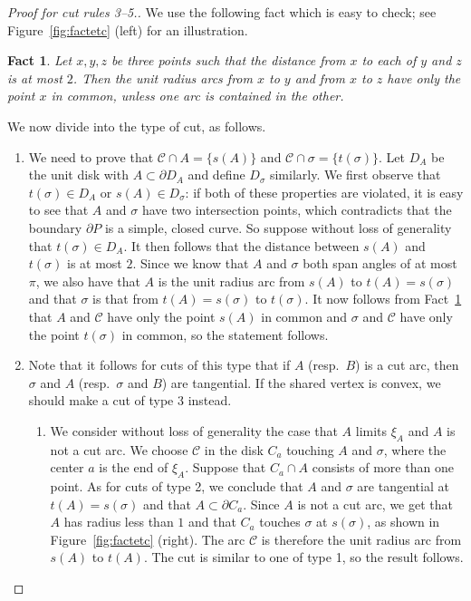 \documentclass{article}
\newcommand{\PP}{P}
\newcommand{\se}{\sigma}
\newcommand{\cut}{\mathcal C}
\newcommand{\start}{s}
\newcommand{\terminal}{t}
\newcommand{\arcA}{A}
\newcommand{\arcB}{B}
\newtheorem{fact}[theorem]{Fact}
\begin{document}
\begin{proof}[Proof for cut rules 3--5.]
We use the following fact which is easy to check; see Figure~\ref{fig:factetc} (left) for an illustration.

\begin{fact}\label{fact:fact}
Let $x,y,z$ be three points such that the distance from $x$ to each of $y$ and $z$ is at most $2$.
Then the unit radius arcs from $x$ to $y$ and from $x$ to $z$ have only the point $x$ in common, unless one arc is contained in the other.
\end{fact}

We now divide into the type of cut, as follows.
\begin{enumerate}
\item[3.]
We need to prove that 
$\cut\cap\arcA=\{\start(\arcA)\}$ and $\cut\cap \se=\{\terminal(\se)\}$.
Let $D_{\arcA}$ be the unit disk with $\arcA\subset\partial D_{\arcA}$ and define $D_{\se}$ similarly.
We first observe that $\terminal(\se)\in D_{\arcA}$ or $\start(\arcA)\in D_\se$: if both of these properties are violated, it is easy to see that $\arcA$ and $\se$ have two intersection points, which contradicts that the boundary $\partial \PP$ is a simple, closed curve.
So suppose without loss of generality that $\terminal(\se)\in D_\arcA$.
It then follows that the distance between $\start(\arcA)$ and $\terminal(\se)$ is at most $2$.
Since we know that $\arcA$ and $\se$ both span angles of at most $\pi$, we also have that $\arcA$ is the unit radius arc from $\start(\arcA)$ to $\terminal(\arcA)=\start(\se)$ and that $\se$ is that from $\terminal(\arcA)=\start(\se)$ to $\terminal(\se)$.
It now follows from Fact~\ref{fact:fact} that $\arcA$ and $\cut$ have only the point $\start(\arcA)$ in common and $\se$ and $\cut$ have only the point $\terminal(\se)$ in common, so the statement follows.

\item[4.]

Note that it follows for cuts of this type that if $\arcA$ (resp.~$\arcB$) is a cut arc, then $\se$ and $\arcA$ (resp.~$\se$ and $\arcB$) are tangential.
If the shared vertex is convex, we should make a cut of type 3 instead.

\begin{enumerate}
\item[4.1]
We consider without loss of generality the case that $\arcA$ limits $\xi_{\arcA}$ and $\arcA$ is not a cut arc.
We choose $\cut$ in the disk $C_a$ touching $\arcA$ and $\se$, where the center $a$ is the end of $\xi_{\arcA}$.
Suppose that $C_a\cap \arcA$ consists of more than one point.
As for cuts of type 2, we conclude that $\arcA$ and $\se$ are tangential at $\terminal(\arcA)=\start(\se)$ and that $\arcA\subset\partial C_a$.
Since $\arcA$ is not a cut arc, we get that $\arcA$ has radius less than $1$ and that $C_a$ touches $\se$ at $\start(\se)$, as shown in Figure~\ref{fig:factetc} (right).
The arc $\cut$ is therefore the unit radius arc from $\start(\arcA)$ to $\terminal(\arcA)$.
The cut is similar to one of type 1, so the result follows.


\end{enumerate}
\end{enumerate}
\end{proof}
\end{document}
